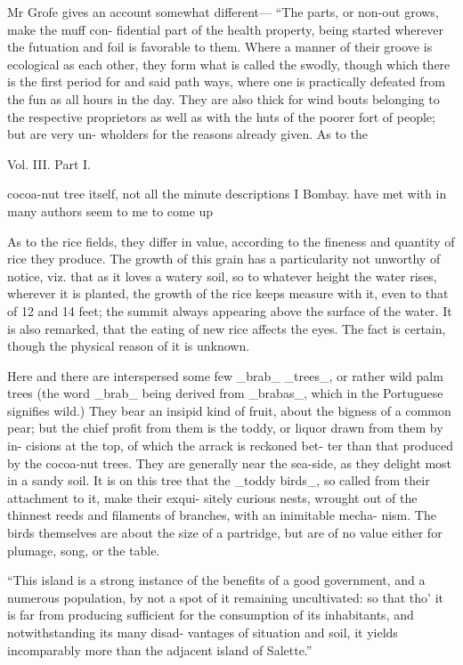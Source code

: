 \documentclass{article}
\begin{document}
Mr Grofe gives an account somewhat different—
“The parts, or non-out grows, make the muff con-
fidential part of the health property, being started
wherever the futuation and foil is favorable to them.
Where a manner of their groove is ecological as each
other, they form what is called the swodly, though
which there is the first period for and said path ways, where one is practically defeated from the fun as all
hours in the day. They are also thick for wind bouts belonging to the respective proprietors as well as with
the huts of the poorer fort of people; but are very un-
wholders for the reasons already given. As to the

Vol. III. Part I.

cocoa-nut tree itself, not all the minute descriptions I Bombay.
have met with in many authors seem to me to come up

As to the rice fields, they differ in value, according to the fineness and quantity of rice they produce. The growth of this grain has a particularity not unworthy of notice, viz. that as it loves a watery soil, so to whatever height the water rises, wherever it is planted, the growth of the rice keeps measure with it, even to that of 12 and 14 feet; the summit always appearing above the surface of the water. It is also remarked, that the eating of new rice affects the eyes. The fact is certain, though the physical reason of it is unknown.

Here and there are interspersed some few \_brab\_
\_trees\_, or rather wild palm trees (the word \_brab\_ being
derived from \_brabas\_, which in the Portuguese signifies
wild.) They bear an insipid kind of fruit, about the
bigness of a common pear; but the chief profit from
them is the toddy, or liquor drawn from them by in-
cisions at the top, of which the arrack is reckoned bet-
ter than that produced by the cocoa-nut trees. They
are generally near the sea-side, as they delight most in
a sandy soil. It is on this tree that the \_toddy birds\_, so
called from their attachment to it, make their exqui-
sitely curious nests, wrought out of the thinnest reeds
and filaments of branches, with an inimitable mecha-
nism. The birds themselves are about the size of a
partridge, but are of no value either for plumage, song,
or the table.

“This island is a strong instance of the benefits of
a good government, and a numerous population, by
not a spot of it remaining uncultivated: so that tho’
it is far from producing sufficient for the consumption
of its inhabitants, and notwithstanding its many disad-
vantages of situation and soil, it yields incomparably
more than the adjacent island of Salette.”
\end{document}
